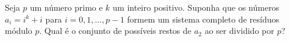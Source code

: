 Seja \(p\) um número primo e \(k\) um inteiro positivo. Suponha que os números \(a_i = i^k + i\) para \(i = 0, 1, \ldots, p-1\) formem um sistema completo de resíduos módulo \(p\). Qual é o conjunto de possíveis restos de \(a_2\) ao ser dividido por \(p\)?
